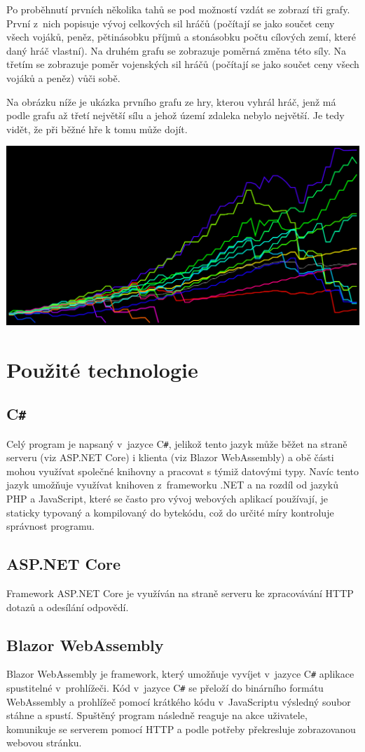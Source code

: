 \documentclass[a4paper,12pt]{article}
\def\CS{C\texttt{\#}}
\begin{document}
Po proběhnutí prvních několika tahů se pod možností vzdát se zobrazí tři grafy. První z~nich popisuje vývoj celkových sil hráčů (počítají se jako součet ceny všech vojáků, peněz, pětinásobku příjmů a stonásobku počtu cílových zemí, které daný hráč vlastní). Na druhém grafu se zobrazuje poměrná změna této síly. Na třetím se zobrazuje poměr vojenských sil hráčů (počítají se jako součet ceny všech vojáků a peněz) vůči sobě.

Na obrázku níže je ukázka prvního grafu ze hry, kterou vyhrál hráč, jenž má podle grafu až třetí největší sílu a jehož území zdaleka nebylo největší. Je tedy vidět, že při běžné hře k tomu může dojít.

\includegraphics[width=\textwidth]{PowersGraph.png}

\section{Použité technologie}
\subsection{\CS{}}
Celý program je napsaný v~jazyce \CS{}, jelikož tento jazyk může běžet na straně serveru (viz ASP.NET Core) i klienta (viz Blazor WebAssembly) a obě části mohou využívat společné knihovny a pracovat s týmiž datovými typy. Navíc tento jazyk umožňuje využívat knihoven z~frameworku .NET a na rozdíl od jazyků PHP a JavaScript, které se často pro vývoj webových aplikací používají, je staticky typovaný a kompilovaný do bytekódu, což do určité míry kontroluje správnost programu.
\subsection{ASP.NET Core}
Framework ASP.NET Core je využíván na straně serveru ke zpracovávání HTTP dotazů a odesílání odpovědí.
\subsection{Blazor WebAssembly}
Blazor WebAssembly je framework, který umožňuje vyvíjet v~jazyce \CS{} aplikace spustitelné v~prohlížeči. Kód v~jazyce \CS{} se přeloží do binárního formátu WebAssembly a prohlížeč pomocí krátkého kódu v~JavaScriptu výsledný soubor stáhne a spustí. Spuštěný program následně reaguje na akce uživatele, komunikuje se serverem pomocí HTTP a podle potřeby překresluje zobrazovanou webovou stránku.
\end{document}
